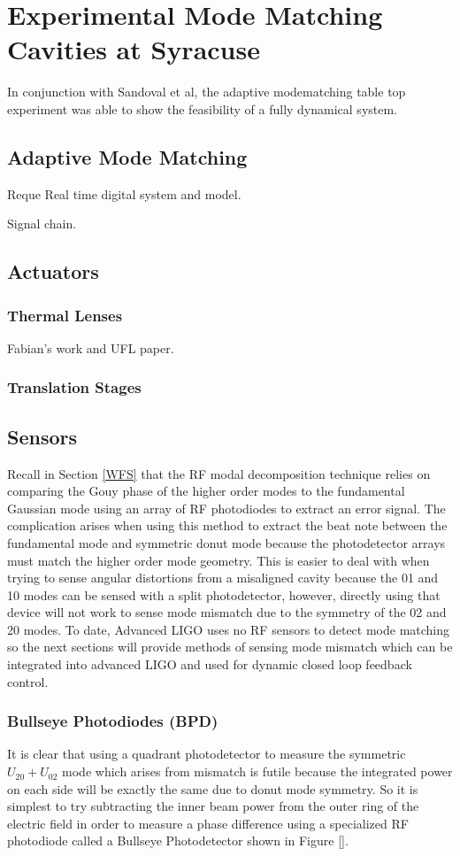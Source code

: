 \chapter{Experimental Mode Matching Cavities at Syracuse}
In conjunction with Sandoval et al, the adaptive modematching table top experiment was able to show the feasibility of a fully dynamical system.
	\section{Adaptive Mode Matching}
	Reque
	Real time digital system and model.
	
	Signal chain.
	
	\section{Actuators}
		\subsection{Thermal Lenses}
		Fabian's work and UFL paper.
		\subsection{Translation Stages}
		
	\section{Sensors}
	Recall in Section \ref{WFS} that the RF modal decomposition technique relies on comparing the Gouy phase of the higher order modes to the fundamental Gaussian mode using an array of RF photodiodes to extract an error signal. The complication arises when using this method to extract the beat note between the fundamental mode and symmetric donut mode because the photodetector arrays must match the higher order mode geometry.  This is easier to deal with when trying to sense angular distortions from a misaligned cavity because the 01 and 10 modes can be sensed with a split photodetector, however, directly using that device will not work to sense mode mismatch due to the symmetry of the 02 and 20 modes. To date, Advanced LIGO uses no RF sensors to detect mode matching so the next sections will provide methods of sensing mode mismatch which can be integrated into advanced LIGO and used for dynamic closed loop feedback control.
		\subsection{Bullseye Photodiodes (BPD)}
		It is clear that using a quadrant photodetector to measure the symmetric $U_{20} + U_{02}$ mode which arises from mismatch is futile because the integrated power on each side will be exactly the same due to donut mode symmetry. So it is simplest to try subtracting the inner beam power from the outer ring of the electric field in order to measure a phase difference using a specialized RF photodiode called a Bullseye Photodetector shown in Figure []. 
		
